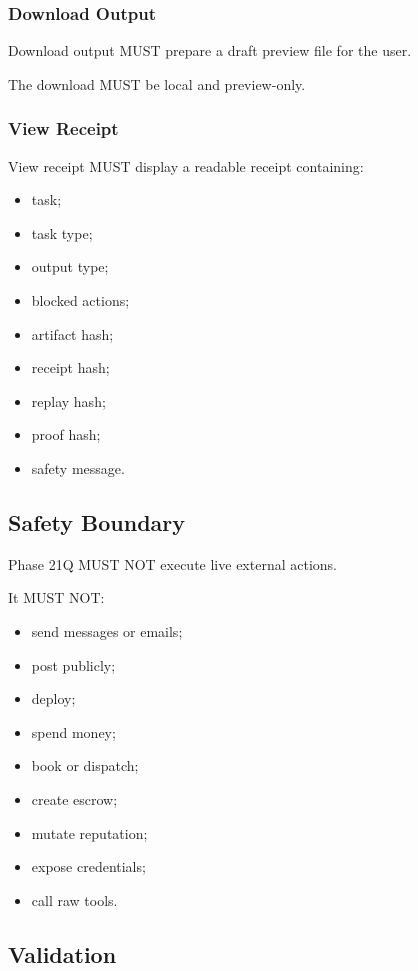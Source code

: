 \subsubsection{Download Output}

Download output MUST prepare a draft preview file for the user.

The download MUST be local and preview-only.

\subsubsection{View Receipt}

View receipt MUST display a readable receipt containing:

\begin{itemize}
  \item task;
  \item task type;
  \item output type;
  \item blocked actions;
  \item artifact hash;
  \item receipt hash;
  \item replay hash;
  \item proof hash;
  \item safety message.
\end{itemize}

\subsection{Safety Boundary}

Phase 21Q MUST NOT execute live external actions.

It MUST NOT:

\begin{itemize}
  \item send messages or emails;
  \item post publicly;
  \item deploy;
  \item spend money;
  \item book or dispatch;
  \item create escrow;
  \item mutate reputation;
  \item expose credentials;
  \item call raw tools.
\end{itemize}

\subsection{Validation}

